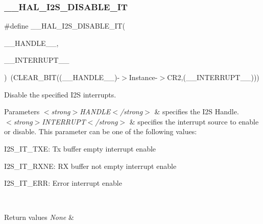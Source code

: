 \subsubsection{\texorpdfstring{\+\_\+\+\_\+\+H\+A\+L\+\_\+\+I2\+S\+\_\+\+D\+I\+S\+A\+B\+L\+E\+\_\+\+IT}{\_\_HAL\_I2S\_DISABLE\_IT}}
{\footnotesize\ttfamily \#define \+\_\+\+\_\+\+H\+A\+L\+\_\+\+I2\+S\+\_\+\+D\+I\+S\+A\+B\+L\+E\+\_\+\+IT(\begin{DoxyParamCaption}\item[{}]{\+\_\+\+\_\+\+H\+A\+N\+D\+L\+E\+\_\+\+\_\+,  }\item[{}]{\+\_\+\+\_\+\+I\+N\+T\+E\+R\+R\+U\+P\+T\+\_\+\+\_\+ }\end{DoxyParamCaption})~(C\+L\+E\+A\+R\+\_\+\+B\+IT((\+\_\+\+\_\+\+H\+A\+N\+D\+L\+E\+\_\+\+\_\+)-\/$>$Instance-\/$>$C\+R2,(\+\_\+\+\_\+\+I\+N\+T\+E\+R\+R\+U\+P\+T\+\_\+\+\_\+)))}



Disable the specified I2S interrupts. 


\begin{DoxyParams}{Parameters}
{\em $<$strong$>$\+H\+A\+N\+D\+L\+E$<$/strong$>$} & specifies the I2S Handle. \\
\hline
{\em $<$strong$>$\+I\+N\+T\+E\+R\+R\+U\+P\+T$<$/strong$>$} & specifies the interrupt source to enable or disable. This parameter can be one of the following values\+: \begin{DoxyItemize}
\item I2\+S\+\_\+\+I\+T\+\_\+\+T\+XE\+: Tx buffer empty interrupt enable \item I2\+S\+\_\+\+I\+T\+\_\+\+R\+X\+NE\+: RX buffer not empty interrupt enable \item I2\+S\+\_\+\+I\+T\+\_\+\+E\+RR\+: Error interrupt enable \end{DoxyItemize}
\\
\hline
\end{DoxyParams}

\begin{DoxyRetVals}{Return values}
{\em None} & \\
\hline
\end{DoxyRetVals}
\mbox{\label{group___i2_s___exported__macros_ga4b5ca1e0e5bf616c99d38b8f0c5bdded}} 
